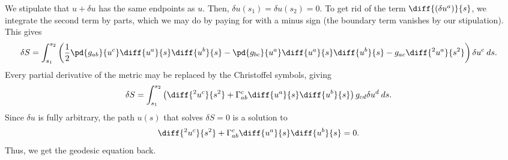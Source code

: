\documentclass[10pt]{mypackage}
\begin{document}
  We stipulate that $u + \delta u$ has the same endpoints as $u$. Then, $\delta u\left( s_1 \right) = \delta u\left( s_2 \right) = 0$. To get rid of the term $\diff{\left( \delta u^{a} \right)}{s}$, we integrate the second term by parts, which we may do by paying for with a minus sign (the boundary term vanishes by our stipulation). This gives
  \begin{align*}
    \delta S &= \int_{s_1}^{s_2} \left( \frac{1}{2}\pd{g_{ab}}{u^{c}}\diff{u^a}{s}\diff{u^b}{s} - \pd{g_{bc}}{u^{a}}\diff{u^a}{s}\diff{u^b}{s} - g_{ac}\diff{^2u^a}{s^2} \right)\delta u^{c}\:ds.
  \end{align*}
  Every partial derivative of the metric may be replaced by the Christoffel symbols, giving
  \begin{align*}
    \delta S &= \int_{s_1}^{s_2} \left( \diff{^2u^c}{s^2} + \Gamma_{ab}^{c}\diff{u^a}{s}\diff{u^b}{s} \right)g_{cd}\delta u^{d}\:ds.
  \end{align*}
  Since $\delta u$ is fully arbitrary, the path $u(s)$ that solves $\delta S = 0$ is a solution to
  \begin{align*}
    \diff{^2u^c}{s^2} + \Gamma_{ab}^{c} \diff{u^a}{s}\diff{u^b}{s} &= 0.
  \end{align*}
  Thus, we get the geodesic equation back.
\end{document}
